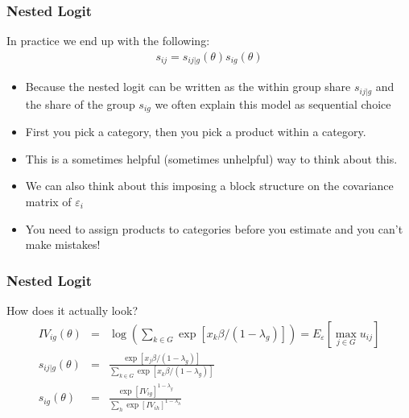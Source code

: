 \documentclass[xcolor=pdftex,dvipsnames,table,mathserif,aspectratio=169]{beamer}
\begin{document}
\begin{frame}
\frametitle{Nested Logit}
In practice we end up with the following:
\begin{eqnarray*}
s_{ij} = s_{ij|g}(\theta) s_{ig}(\theta)
\end{eqnarray*}
\vspace{-0.5cm}
\begin{itemize}
\item Because the nested logit can be written as the within group share $s_{ij|g}$ and the share of the group $s_{ig}$ we often explain this model as \alert{sequential choice}
\item First you pick a category, then you pick a product within a category.
\item This is a sometimes helpful (sometimes unhelpful) way to think about this.
\item We can also think about this imposing a block structure on the covariance matrix of $\varepsilon_i$
\item You need to assign products to categories \alert{before you estimate} and you can't make mistakes!
\end{itemize}
\end{frame}

\begin{frame}
\frametitle{Nested Logit}
How does it actually look?
\begin{eqnarray*}
 IV_{ig}(\theta) &=& \log \left(\sum_{k \in G} \exp [x_k \beta/(1-\lambda_g)] \right) = E_{\varepsilon}[\max_{j \in G} u_{ij}]\\
 s_{ij|g}(\theta) &=& \frac{\exp [x_j \beta/(1-\lambda_g)]}{\sum_{k \in G} \exp [x_k \beta/(1-\lambda_g)]} \\
 s_{ig}(\theta) &=& \frac{\exp [IV_{ig}]^{1-\lambda_g}}{\sum_{h} \exp [IV_{ih}]^{1-\lambda_h}} 
\end{eqnarray*}
\end{frame}
\end{document}

